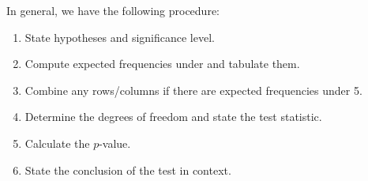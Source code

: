 In general, we have the following procedure:

\begin{recipe}
    \phantom{.}
    \begin{enumerate}
        \item State hypotheses and significance level.
        \item Compute expected frequencies under \nullhyp{} and tabulate them.
        \item Combine any rows/columns if there are expected frequencies under 5.
        \item Determine the degrees of freedom and state the test statistic.
        \item Calculate the $p$-value.
        \item State the conclusion of the test in context.
    \end{enumerate}
\end{recipe}